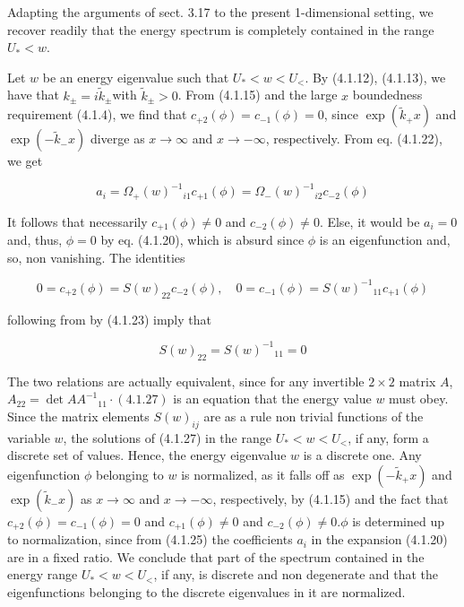 \documentclass{article}
\begin{document}
Adapting the arguments of sect. 3.17 to the present 1-dimensional setting, we recover readily that the energy spectrum is completely contained in the range $U_{*}<w$.

Let $w$ be an energy eigenvalue such that $U_{*}<w<U_{<}$. By (4.1.12), (4.1.13), we have that $k_{ \pm}=i \tilde{k}_{ \pm}$with $\tilde{k}_{ \pm}>0$. From (4.1.15) and the large $x$ boundedness requirement (4.1.4), we find that $c_{+2}(\phi)=c_{-1}(\phi)=0$, since $\exp \left(\tilde{k}_{+} x\right)$ and $\exp \left(-\tilde{k}_{-} x\right)$ diverge as $x \rightarrow \infty$ and $x \rightarrow-\infty$, respectively. From eq. (4.1.22), we get
 
\begin{equation*}
a_{i}=\Omega_{+}(w)^{-1}{ }_{i 1} c_{+1}(\phi)=\Omega_{-}(w)^{-1}{ }_{i 2} c_{-2}(\phi) \tag{4.1.25}
\end{equation*}
 

It follows that necessarily $c_{+1}(\phi) \neq 0$ and $c_{-2}(\phi) \neq 0$. Else, it would be $a_{i}=0$ and, thus, $\phi=0$ by eq. (4.1.20), which is absurd since $\phi$ is an eigenfunction and, so, non vanishing. The identities
 
\begin{equation*}
0=c_{+2}(\phi)=S(w)_{22} c_{-2}(\phi), \quad 0=c_{-1}(\phi)=S(w)^{-1}{ }_{11} c_{+1}(\phi) \tag{4.1.26}
\end{equation*}
 
following from by (4.1.23) imply that
 
\begin{equation*}
S(w)_{22}=S(w)^{-1}{ }_{11}=0 \tag{4.1.27}
\end{equation*}
 

The two relations are actually equivalent, since for any invertible $2 \times 2$ matrix $A$, $A_{22}=\operatorname{det} A A^{-1}{ }_{11} \cdot(4.1 .27)$ is an equation that the energy value $w$ must obey. Since the matrix elements $S(w)_{i j}$ are as a rule non trivial functions of the variable $w$, the solutions of (4.1.27) in the range $U_{*}<w<U_{<}$, if any, form a discrete set of values. Hence, the energy eigenvalue $w$ is a discrete one. Any eigenfunction $\phi$ belonging to $w$ is normalized, as it falls off as $\exp \left(-\tilde{k}_{+} x\right)$ and $\exp \left(\tilde{k}_{-} x\right)$ as $x \rightarrow \infty$ and $x \rightarrow-\infty$, respectively, by (4.1.15) and the fact that $c_{+2}(\phi)=c_{-1}(\phi)=0$ and $c_{+1}(\phi) \neq 0$ and $c_{-2}(\phi) \neq 0 . \phi$ is determined up to normalization, since from (4.1.25) the coefficients $a_{i}$ in the expansion (4.1.20) are in a fixed ratio. We conclude that part of the spectrum contained in the energy range $U_{*}<w<U_{<}$, if any, is discrete and non degenerate and that the eigenfunctions belonging to the discrete eigenvalues in it are normalized.
\end{document}
